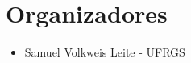 
\chapter*{Organizadores}\label{Organizadores}

\begin{itemize}
\item[] Samuel Volkweis Leite - UFRGS
\end{itemize}